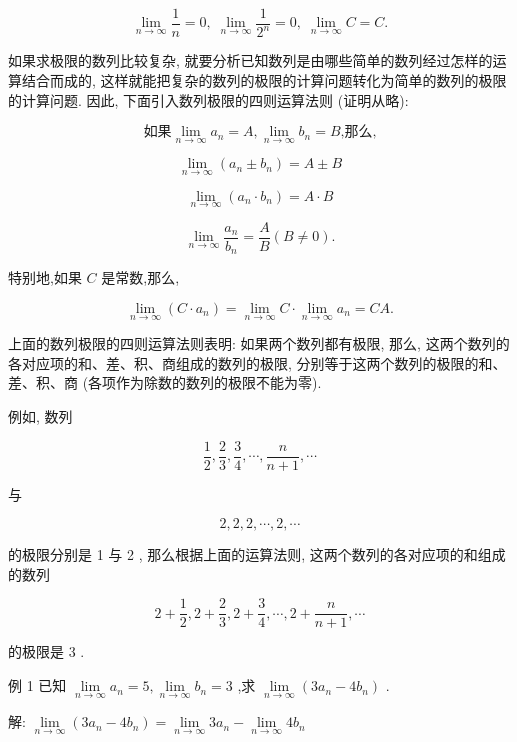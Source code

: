 \documentclass[lang=cn,newtx,10pt,scheme=chinese]{elegantbook}
\begin{document}
\[
\mathop{\lim }\limits_{{n \rightarrow \infty }}\frac{1}{n} = 0,\;\mathop{\lim }\limits_{{n \rightarrow \infty }}\frac{1}{{2}^{n}} = 0,\;\mathop{\lim }\limits_{{n \rightarrow \infty }}C = C.
\]

如果求极限的数列比较复杂, 就要分析已知数列是由哪些简单的数列经过怎样的运算结合而成的, 这样就能把复杂的数列的极限的计算问题转化为简单的数列的极限的计算问题. 因此, 下面引入数列极限的四则运算法则 (证明从略):

\[
\text{如果}\mathop{\lim }\limits_{{n \rightarrow \infty }}{a}_{n} = A,\mathop{\lim }\limits_{{n \rightarrow \infty }}{b}_{n} = B\text{,那么,}
\]

\[
\mathop{\lim }\limits_{{n \rightarrow \infty }}\left( {{a}_{n} \pm {b}_{n}}\right) = A \pm B
\]

\[
\mathop{\lim }\limits_{{n \rightarrow \infty }}\left( {{a}_{n} \cdot {b}_{n}}\right) = A \cdot B
\]

\[
\mathop{\lim }\limits_{{n \rightarrow \infty }}\frac{{a}_{n}}{{b}_{n}} = \frac{A}{B}\left( {B \neq 0}\right) .
\]

特别地,如果 \(C\) 是常数,那么,

\[
\mathop{\lim }\limits_{{n \rightarrow \infty }}\left( {C \cdot {a}_{n}}\right) = \mathop{\lim }\limits_{{n \rightarrow \infty }}C \cdot \mathop{\lim }\limits_{{n \rightarrow \infty }}{a}_{n} = {CA}.
\]

上面的数列极限的四则运算法则表明: 如果两个数列都有极限, 那么, 这两个数列的各对应项的和、差、积、商组成的数列的极限, 分别等于这两个数列的极限的和、差、积、商 (各项作为除数的数列的极限不能为零).

例如, 数列

\[
\frac{1}{2},\frac{2}{3},\frac{3}{4},\cdots ,\frac{n}{n + 1},\cdots
\]

与

\[
2,2,2,\cdots ,2,\cdots
\]

的极限分别是 1 与 2 , 那么根据上面的运算法则, 这两个数列的各对应项的和组成的数列

\[
2 + \frac{1}{2},2 + \frac{2}{3},2 + \frac{3}{4},\cdots ,2 + \frac{n}{n + 1},\cdots
\]

的极限是 3 .

例 1 已知 \(\mathop{\lim }\limits_{{n \rightarrow \infty }}{a}_{n} = 5,\mathop{\lim }\limits_{{n \rightarrow \infty }}{b}_{n} = 3\) ,求 \(\mathop{\lim }\limits_{{n \rightarrow \infty }}\left( {3{a}_{n} - 4{b}_{n}}\right)\) .

解: \(\mathop{\lim }\limits_{{n \rightarrow \infty }}\left( {3{a}_{n} - 4{b}_{n}}\right) = \mathop{\lim }\limits_{{n \rightarrow \infty }}3{a}_{n} - \mathop{\lim }\limits_{{n \rightarrow \infty }}4{b}_{n}\)
\end{document}
